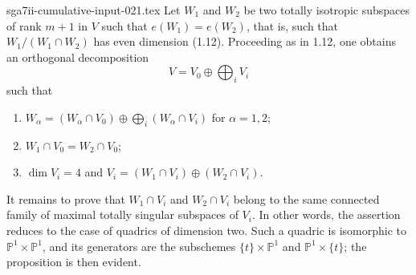 \begin{filecontents*}{sga7ii-cumulative-input-021.tex}
Let $W_1$ and $W_2$ be two totally isotropic subspaces of rank $m+1$ in
$V$ such that $e(W_1)=e(W_2)$, that is, such that
$W_1/(W_1\cap W_2)$ has even dimension (1.12).  Proceeding as in 1.12,
one obtains an orthogonal decomposition
\begin{equation*}
V=V_0\oplus\bigoplus_i V_i
\end{equation*}
such that
\begin{enumerate}[label=\alph*),leftmargin=2.5em]
\item $W_\alpha=(W_\alpha\cap V_0)\oplus
  \displaystyle\bigoplus_i(W_\alpha\cap V_i)$ for $\alpha=1,2$;
\item $W_1\cap V_0=W_2\cap V_0$;
\item $\dim V_i=4$ and
  $V_i=(W_1\cap V_i)\oplus(W_2\cap V_i)$.
\end{enumerate}
It remains to prove that $W_1\cap V_i$ and $W_2\cap V_i$ belong to the
same connected family of maximal totally singular subspaces of $V_i$.
In other words, the assertion reduces to the case of quadrics of
dimension two.  Such a quadric is isomorphic to
$\mathbb P^1\times\mathbb P^1$, and its generators are the subschemes
$\{t\}\times\mathbb P^1$ and $\mathbb P^1\times\{t\}$; the proposition
is then evident.
\end{filecontents*}

